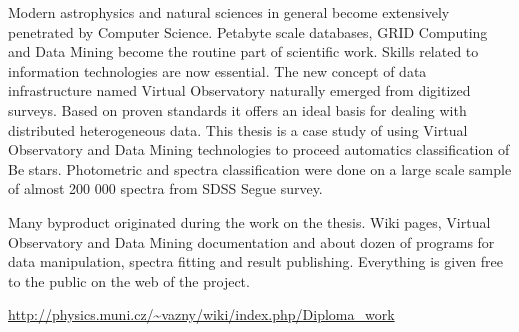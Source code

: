 


\begin{abstracts}        %


  Modern astrophysics and natural sciences in general become
  extensively penetrated by Computer Science. Petabyte scale
  databases, GRID Computing and Data Mining become the routine part of
  scientific work. Skills related to information technologies are now
  essential. The new concept of data infrastructure named Virtual
  Observatory naturally emerged from digitized surveys. Based on
  proven standards it offers an ideal basis for dealing with distributed
  heterogeneous data. This thesis is a case study of using Virtual
  Observatory and Data Mining technologies to proceed automatics
  classification of Be stars. Photometric and spectra classification
  were done on a large scale sample of almost 200 000 spectra from SDSS
  Segue survey.

  Many byproduct originated during the work on the thesis. Wiki pages,
  Virtual Observatory and Data Mining documentation and about dozen of
  programs for data manipulation, spectra fitting and result
  publishing. Everything is given free to the public on the web of the
  project.


  \url{http://physics.muni.cz/~vazny/wiki/index.php/Diploma_work}

\end{abstracts}
\cfoot{\thepage}





